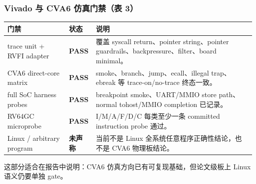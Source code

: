 \documentclass[aspectratio=169,10pt]{beamer}
\newcommand{\tagok}[1]{\textcolor{rvgreen}{\textbf{#1}}}
\newcommand{\tagwarn}[1]{\textcolor{rvorange}{\textbf{#1}}}
\begin{document}
\begin{frame}
  \frametitle{Vivado 与 CVA6 仿真门禁（表 3）}
  \vskip0.1cm
  \begin{center}\scriptsize
  \renewcommand{\arraystretch}{1.20}
  \begin{tabularx}{0.96\linewidth}{@{}L{3.15cm}L{1.35cm}Y@{}}
    \toprule
    \textbf{门禁} & \textbf{状态} & \textbf{说明} \\
    \midrule
    trace unit + RVFI adapter & \tagok{PASS} & 覆盖 syscall return、pointer string、pointer guardrails、backpressure、filter、board minimal。 \\
    CVA6 direct-core matrix & \tagok{PASS} & smoke、branch、jump、ecall、illegal trap、ebreak 等 trace-on/no-trace 终态一致。 \\
    full SoC harness probes & \tagok{PASS} & breakpoint smoke、UART/MMIO store path、normal tohost/MMIO completion 已记录。 \\
    RV64GC microprobe & \tagok{PASS} & I/M/A/F/D/C 每类至少一条 committed instruction probe 通过。 \\
    Linux / arbitrary program & \tagwarn{未声称} & 当前不是 Linux 全系统任意程序正确性结论，也不是 CVA6 物理板结论。 \\
    \bottomrule
  \end{tabularx}
  \end{center}

  \vskip0.1cm
  \small
  这部分适合在报告中说明：CVA6 仿真方向已有可复现基础，但论文级板上 Linux 语义仍要单独 gate。
\end{frame}
\end{document}
